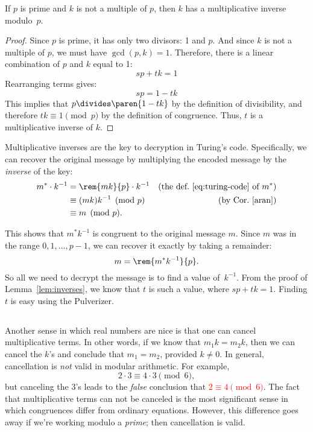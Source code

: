 \begin{lemma}
\label{lem:inverses}
If $p$ is prime and $k$ is not a multiple of $p$, then $k$ has a
multiplicative inverse modulo~$p$.
\end{lemma}

\begin{proof}
Since $p$ is prime, it has only two divisors: 1 and $p$.  And since
$k$ is not a multiple of $p$, we must have $\gcd(p, k) = 1$.
Therefore, there is a linear combination of $p$ and $k$ equal to 1:
%
\[
s p + t k = 1
\]
%
Rearranging terms gives:
%
\[
s p = 1 - t k
\]
%
This implies that $p \divides \paren{1 - tk}$ by the definition of divisibility,
and therefore $tk \equiv 1 \pmod{p}$ by the definition of congruence.
Thus, $t$ is a multiplicative inverse of $k$.
\end{proof}

Multiplicative inverses are the key to decryption in Turing's code.
Specifically, we can recover the original message by multiplying the
encoded message by the \emph{inverse} of the key:
\begin{align*}
m^* \cdot k^{-1}
    & = \rem{mk}{p} \cdot k^{-1}
         & \text{(the def.~\eqref{eq:turing-code} of $m^*$)}\\
    & \equiv (mk)k^{-1} \pmod{p} & \text{(by Cor.~\ref{aran})}\\
    & \equiv m \pmod{p}.
\end{align*}

This shows that $m^* k^{-1}$ is congruent to the original message $m$.
Since $m$ was in the range $0, 1, \dots, p - 1$, we can recover
it exactly by taking a remainder:
%
\[
m = \rem{m^* k^{-1}}{p}.
\]
%
So all we need to decrypt the message is to find a value of~$k^{-1}$.
From the proof of Lemma~\ref{lem:inverses}, we know that $t$ is such a
value, where $sp + tk = 1$.  Finding $t$ is easy using the Pulverizer.

\subsection{}

Another sense in which real numbers are nice is that one can cancel
multiplicative terms.  In other words, if we know that $m_1 k = m_2 k$,
then we can cancel the $k$'s and conclude that $m_1 = m_2$, provided $k
\neq 0$.  In general, cancellation is \emph{not} valid in modular
arithmetic.  For example,
%
\[
2 \cdot 3 \equiv 4 \cdot 3 \pmod{6},
\]
%
but canceling the 3's leads to the \emph{false} conclusion
that \textcolor{red}{$2 \equiv 4 \pmod{6}$}.  The fact that
multiplicative terms can not be canceled is the most significant
sense in which congruences differ from ordinary equations.  However,
this difference goes away if we're working modulo a
\emph{prime}; then cancellation is valid.

